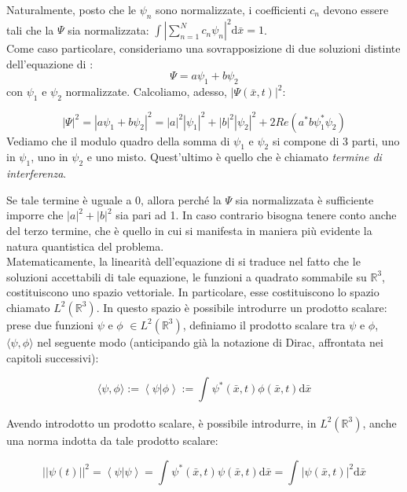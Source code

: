 Naturalmente, posto che le $\psi_n$ sono normalizzate, i coefficienti $c_n$ devono essere tali che la $\Psi$ sia normalizzata: $\int{|\sum_{n=1}^{N}c_n\psi_n|^2\textrm{d}\bar x} = 1$.
\\

Come caso particolare, consideriamo una sovrapposizione di due soluzioni distinte dell'equazione di \sch: 
\begin{equation}
\Psi=a\psi_1+b\psi_2
\end{equation} 
con $\psi_1$ e $\psi_2$ normalizzate.
Calcoliamo, adesso, $|\Psi(\bar x,t)|^2$:

\begin{equation}
|\Psi|^2=|a\psi_1+b\psi_2|^2=|a|^2|\psi_1|^2+|b|^2|\psi_2|^2+2Re(a^*b\psi_1^*\psi_2)
\end{equation}
Vediamo che il modulo quadro della somma di $\psi_1$ e $\psi_2$ si compone di 3 parti, uno in $\psi_1$, uno in $\psi_2$ e uno misto. Quest'ultimo è quello che è chiamato \emph{termine di interferenza}.

Se tale termine è uguale a 0, allora perché la $\Psi$ sia normalizzata è sufficiente imporre che $|a|^2+|b|^2$ sia pari ad 1. In caso contrario bisogna tenere conto anche del terzo termine, che è quello in cui si manifesta in maniera più evidente la natura quantistica del problema.
\\

Matematicamente, la linearità dell'equazione di \sch si traduce nel fatto che le soluzioni accettabili di tale equazione, le funzioni a quadrato sommabile su $\mathbb{R}^3$, costituiscono uno spazio vettoriale. In particolare, esse costituiscono lo spazio chiamato $L^2(\mathbb{R}^3)$.
In questo spazio è possibile introdurre un prodotto scalare: prese due funzioni $\psi$ e $\phi$ $\in L^2(\mathbb{R}^3)$, definiamo il prodotto scalare tra $\psi$ e $\phi$, $\langle\psi, \phi\rangle$ nel seguente modo (anticipando già la notazione di Dirac, affrontata nei capitoli successivi):

\begin{equation}
\langle \psi ,\phi \rangle:=\left \langle\psi |\phi  \right\rangle:=\int_{}^{}{\psi ^*\left(\bar x,t\right)\phi \left(\bar x,t\right) \textrm{d}\bar x}
\end{equation}

Avendo introdotto un prodotto scalare, è possibile introdurre, in $L^2(\mathbb{R}^3)$, anche una norma indotta da tale prodotto scalare:

\begin{equation}
||\psi \left(t\right)||^2=\left \langle\psi |\psi  \right\rangle=\int_{}^{}{\psi ^*\left(\bar x,t\right)\psi \left(\bar x,t\right) \textrm{d}\bar x}=\int_{}^{}{|\psi(\bar x,t) |^2 \textrm{d}\bar x}
\end{equation}

